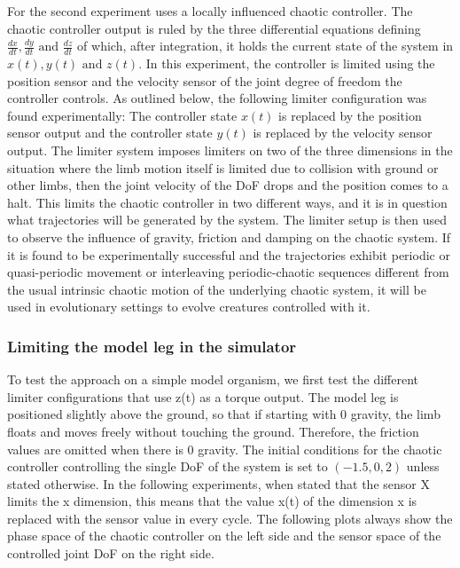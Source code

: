 \documentclass[main]{subfiles}
\begin{document}
For the second experiment uses a locally influenced chaotic controller. The chaotic controller output is ruled by the three differential equations defining \(\frac{dx}{dt},\frac{dy}{dt} \text{ and } \frac{dz}{dt}\) of which, after integration, it holds the current state of the system in \(x(t),y(t) \text{ and } z(t)\).  In this experiment, the controller is limited using the position sensor and the velocity sensor of the joint degree of freedom the controller controls. As outlined below, the following limiter configuration was found experimentally: The controller state \(x(t)\) is replaced by the position sensor output and the controller state \(y(t)\) is replaced by the velocity sensor output. The limiter system imposes limiters on two of the three dimensions in the situation where the limb motion itself is limited due to collision with ground or other limbs, then the joint velocity of the DoF drops and the position comes to a halt. This limits the chaotic controller in two different ways, and it is in question what trajectories will be generated by the system. The limiter setup is then used to observe the influence of gravity, friction and damping on the chaotic system. If it is found to be experimentally successful and the trajectories exhibit periodic or quasi-periodic movement or interleaving periodic-chaotic sequences different from the usual intrinsic chaotic motion of the underlying chaotic system, it will be used in evolutionary settings to evolve creatures controlled with it.

\subsubsection{Limiting the model leg in the simulator}

To test the approach on a simple model organism, we first test the different limiter configurations that use z(t) as a torque output. The model leg is positioned slightly above the ground, so that if starting with 0 gravity, the limb floats and moves freely without touching the ground. Therefore, the friction values are omitted when there is 0 gravity. The initial conditions for the chaotic controller controlling the single DoF of the system is set to \((-1.5,0,2)\) unless stated otherwise. In the following experiments, when stated that the sensor X limits the x dimension, this means that the value x(t) of the dimension x is replaced with the sensor value in every cycle. The following plots always show the phase space of the chaotic controller on the left side and the sensor space of the controlled joint DoF on the right side.
\end{document}
